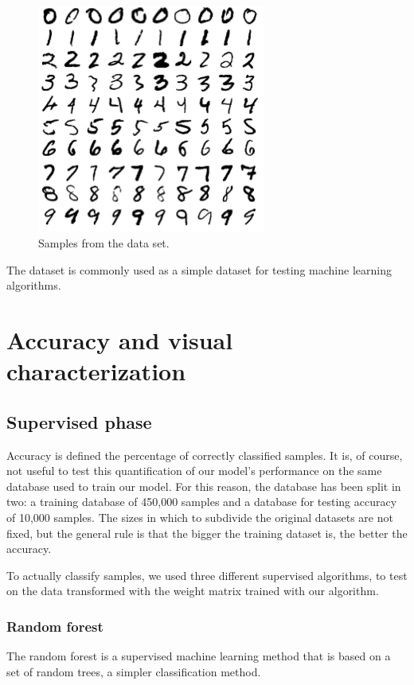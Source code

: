 \documentclass[a4paper]{report}
\begin{document}
\begin{figure} [H]
	\centering
	\includegraphics [width=7.5cm ] {o/mnist.png}
	\caption{Samples from the data set.}
	\label{mnist}
\end{figure}

The dataset is commonly used as a simple dataset for testing machine learning algorithms.
\chapter{Accuracy and visual characterization}

\section{Supervised phase}
Accuracy is defined the percentage of correctly classified samples.
It is, of course, not useful to test this quantification of our model's performance on the same database used to train our model.
For this reason, the database has been split in two:
a training database of 450,000 samples and a database for testing accuracy of 10,000 samples.
The sizes in which to subdivide the original datasets are not fixed, but the general rule is that the bigger the training dataset is, the better the accuracy.

To actually classify samples, we used three different supervised algorithms, to test on the data transformed with the weight matrix trained with our algorithm.

\subsection{Random forest}
The random forest is a supervised machine learning method that is based on a set of random trees, a simpler classification method.
\end{document}
